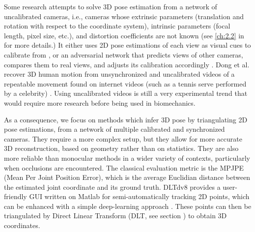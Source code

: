 Some research attempts to solve 3D pose estimation from a network of uncalibrated cameras, i.e., cameras whose extrinsic parameters (translation and rotation with respect to the coordinate system), intrinsic parameters (focal length, pixel size, etc.), and distortion coefficients are not known (see \autoref{ch:2.2} in  for more details.) It either uses 2D pose estimations of each view as visual cues to calibrate from \cite{Takahashi2018, Xu2021, Liu2022a}, or an adversarial network that predicts views of other cameras, compares them to real views, and adjusts its calibration accordingly \cite{Ershadi-Nasab2021}. Dong et al. recover 3D human motion from unsynchronized and uncalibrated videos of a repeatable movement found on internet videos (such as a tennis serve performed by a celebrity) \cite{Dong2020}. Using uncalibrated videos is still a very experimental trend that would require more research before being used in biomechanics. 

As a consequence, we focus on methods which infer 3D pose by triangulating 2D pose estimations, from a network of multiple calibrated and synchronized cameras. They require a more complex setup, but they allow for more accurate 3D reconstruction, based on geometry rather than on statistics. They are also more reliable than monocular methods in a wider variety of contexts, particularly when occlusions are encountered. The classical evaluation metric is the MPJPE (Mean Per Joint Position Error), which is the average Euclidian distance between the estimated joint coordinate and its ground truth. DLTdv8 provides a user-friendly GUI written on Matlab for semi-automatically tracking 2D points, which can be enhanced with a simple deep-learning approach \cite{Hedrick2008,DLTdv8}. These points can then be triangulated by Direct Linear Transform (DLT, see section ) to obtain 3D coordinates. 

